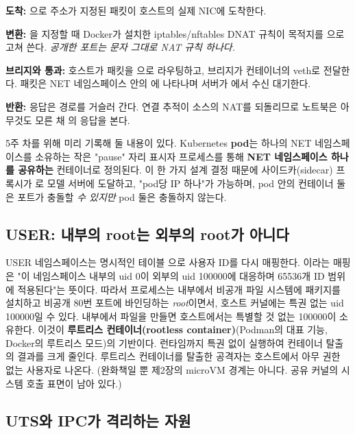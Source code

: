 \begin{tbbitemize}
  \item \textbf{도착:} 으로 주소가 지정된 패킷이 호스트의 실제 NIC에 도착한다.
  \item \textbf{변환:} 을 지정할 때 Docker가 설치한 iptables/nftables DNAT 규칙이 목적지를 으로 고쳐 쓴다. \textit{공개한 포트는 문자 그대로 NAT 규칙 하나다.}
  \item \textbf{브리지와 통과:} 호스트가 패킷을 으로 라우팅하고, 브리지가 컨테이너의 veth로 전달한다. 패킷은 NET 네임스페이스 안의 에 나타나며 서버가 에서 수신 대기한다.
  \item \textbf{반환:} 응답은 경로를 거슬러 간다. 연결 추적이 소스의 NAT를 되돌리므로 노트북은 아무것도 모른 채 의 응답을 본다.
\end{tbbitemize}

5주 차를 위해 미리 기록해 둘 내용이 있다. Kubernetes \textbf{pod}는 하나의 NET 네임스페이스를 소유하는 작은 "pause" 자리 표시자 프로세스를 통해 \textbf{NET 네임스페이스 하나를 공유하는} 컨테이너로 정의된다. 이 한 가지 설계 결정 때문에 사이드카(sidecar) 프록시가 로 모델 서버에 도달하고, "pod당 IP 하나"가 가능하며, pod 안의 컨테이너 둘은 포트가 충돌할 \textit{수 있지만} pod 둘은 충돌하지 않는다.

\subsection*{USER: 내부의 root는 외부의 root가 아니다}

USER 네임스페이스는 명시적인 테이블 으로 사용자 ID를 다시 매핑한다. 이라는 매핑은 "이 네임스페이스 내부의 uid 0이 외부의 uid 100000에 대응하며 65536개 ID 범위에 적용된다"는 뜻이다. 따라서 프로세스는 내부에서 비공개 파일 시스템에 패키지를 설치하고 비공개 80번 포트에 바인딩하는 \textit{root}이면서, 호스트 커널에는 특권 없는 uid 100000일 수 있다. 내부에서 파일을 만들면 호스트에서는 특별할 것 없는 100000이 소유한다. 이것이 \textbf{루트리스 컨테이너(rootless container)}(Podman의 대표 기능, Docker의 루트리스 모드)의 기반이다. 런타임까지 특권 없이 실행하여 컨테이너 탈출의 결과를 크게 줄인다. 루트리스 컨테이너를 탈출한 공격자는 호스트에서 아무 권한 없는 사용자로 나온다. (완화책일 뿐 제2장의 microVM 경계는 아니다. 공유 커널의 시스템 호출 표면이 남아 있다.)

\subsection*{UTS와 IPC가 격리하는 자원}

